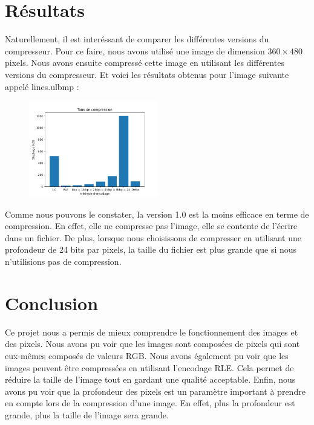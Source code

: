 \documentclass[utf8]{article}
\begin{document}
\section{Résultats}
Naturellement, il est interéssant de comparer les différentes versions du compresseur. Pour ce faire, nous avons utilisé une image de dimension $360 \times 480$ pixels. Nous avons ensuite compressé cette image en utilisant les différentes versions du compresseur. Et voici les résultats obtenus pour l'image suivante appelé lines.ulbmp : 
\begin{figure}[H]
\centering
\includegraphics[width=0.5\textwidth]{graph.png}
\label{fig:graphique}
\end{figure}

Comme nous pouvons le constater, la version 1.0 est la moins efficace en terme de compression. En effet, elle ne compresse pas l'image, elle se contente de l'écrire dans un fichier. De plus, lorsque nous choisissons de compresser en utilisant une profondeur de 24 bits par pixels, la taille du fichier est plus grande que si nous n'utilisions pas de compression.
\section{Conclusion}
Ce projet nous a permis de mieux comprendre le fonctionnement des images et des pixels. Nous avons pu voir que les images sont composées de pixels qui sont eux-mêmes composés de valeurs RGB. Nous avons également pu voir que les images peuvent être compressées en utilisant l'encodage RLE. Cela permet de réduire la taille de l'image tout en gardant une qualité acceptable. Enfin, nous avons pu voir que la profondeur des pixels est un paramètre important à prendre en compte lors de la compression d'une image. En effet, plus la profondeur est grande, plus la taille de l'image sera grande.
\end{document}

